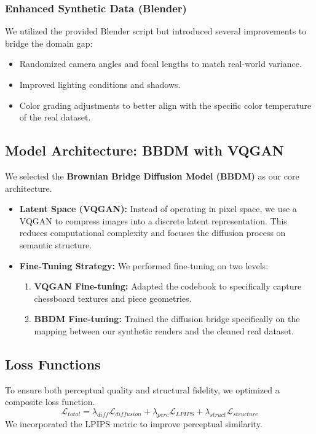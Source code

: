 \documentclass[12pt,a4paper]{article}
\begin{document}
\subsubsection{Enhanced Synthetic Data (Blender)}
We utilized the provided Blender script but introduced several improvements to bridge the domain gap:
\begin{itemize}
    \item Randomized camera angles and focal lengths to match real-world variance.
    \item Improved lighting conditions and shadows.
    \item Color grading adjustments to better align with the specific color temperature of the real dataset.
\end{itemize}

\subsection{Model Architecture: BBDM with VQGAN}
We selected the \textbf{Brownian Bridge Diffusion Model (BBDM)} \cite{bbdm2023} as our core architecture.
\begin{itemize}
    \item \textbf{Latent Space (VQGAN):} Instead of operating in pixel space, we use a VQGAN \cite{vqgan2021} to compress images into a discrete latent representation. This reduces computational complexity and focuses the diffusion process on semantic structure.
    \item \textbf{Fine-Tuning Strategy:} We performed fine-tuning on two levels:
    \begin{enumerate}
        \item \textbf{VQGAN Fine-tuning:} Adapted the codebook to specifically capture chessboard textures and piece geometries.
        \item \textbf{BBDM Fine-tuning:} Trained the diffusion bridge specifically on the mapping between our synthetic renders and the cleaned real dataset.
    \end{enumerate}
\end{itemize}

\subsection{Loss Functions}
\label{subsec:loss}
To ensure both perceptual quality and structural fidelity, we optimized a composite loss function.
\begin{equation}
    \mathcal{L}_{total} = \lambda_{diff} \mathcal{L}_{diffusion} + \lambda_{perc} \mathcal{L}_{LPIPS} + \lambda_{struct} \mathcal{L}_{structure}
\end{equation}
We incorporated the LPIPS metric \cite{lpips2018} to improve perceptual similarity.
\end{document}
